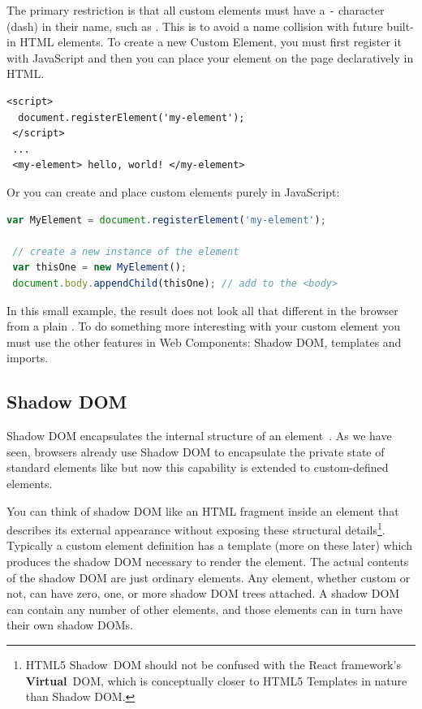 The primary restriction is that all custom elements must have a \texttt{-} character (dash) in their name, such as . 
This is to avoid a name collision with future built-in HTML elements. 
To create a new Custom Element, you must first register it with JavaScript and then you can place your element on the page declaratively in HTML.

\begin{lstlisting}[language=HTML5,caption={Placing a custom element declaratively in HTML.},label=l:registerhtml]
 <script>
  document.registerElement('my-element');
 </script>
 ...
 <my-element> hello, world! </my-element>
\end{lstlisting}

Or you can create and place custom elements purely in JavaScript:

\begin{lstlisting}[language=JavaScript,caption={Placing a custom element imperatively in JavaScript\index{JavaScript}.},label=l:register]
 var MyElement = document.registerElement('my-element');

 // create a new instance of the element
 var thisOne = new MyElement();      
 document.body.appendChild(thisOne); // add to the <body>
\end{lstlisting}

In this small example, the result does not look all that different in the browser from a plain .
To do something more interesting with your custom element you must use the other features in Web Components: Shadow DOM, templates and imports.

\subsection{Shadow DOM}
\label{bg:shadowdom}
Shadow DOM encapsulates the internal structure of an element~\cite{w3ccontributors2015}. 
As we have seen, browsers already use Shadow DOM to encapsulate the private state of standard elements like  but now this capability is extended to custom-defined elements.

You can think of shadow DOM like an HTML fragment inside an element that describes its external appearance without exposing these structural details\footnote{HTML5 Shadow~DOM should not be confused with the React framework's \textbf{Virtual}~DOM, which is conceptually closer to HTML5 Templates in nature than Shadow DOM.}. 
Typically a custom element definition has a template (more on these later) which produces the shadow DOM necessary to render the element.
The actual contents of the shadow DOM are just ordinary elements.
Any element, whether custom or not, can have zero, one, or more shadow DOM trees attached.
A shadow DOM can contain any number of other elements, and those elements can in turn have their own shadow DOMs.

